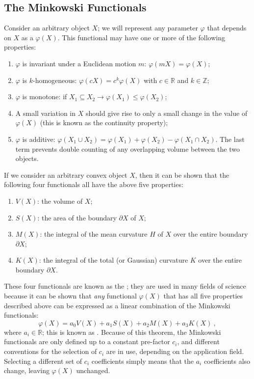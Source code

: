 \subsection{The Minkowski Functionals}\label{\chabbr:ssec:MinkFunc}
Consider an arbitrary object $X$; we will represent any parameter $\varphi$ that depends on $X$ as a  $\varphi(X)$.  This functional may have one or more of the following properties:
\begin{enumerate}
\item $\varphi$ is invariant under a Euclidean motion $m$: $\varphi(mX) = \varphi(X)$; 
\item $\varphi$ is $k$-homogeneous: $\varphi(cX)=c^k\varphi(X)$ with $c\in\mathbb{R}$ and $k\in\mathbb{Z}$;
\item $\varphi$ is monotone: if $X_1\subseteq X_2\rightarrow \varphi(X_1)\le \varphi(X_2)$;
\item A small variation in $X$ should give rise to only a small change in the value of $\varphi(X)$ (this is known as the continuity property);
\item $\varphi$ is additive: $\varphi(X_1\cup X_2) = \varphi(X_1)+\varphi(X_2)-\varphi(X_1\cap X_2)$. The last term prevents double counting of any overlapping volume between the two objects.
\end{enumerate}

\noindent If we consider an arbitrary convex object $X$, then it can be shown that the following four functionals all have the above five properties:
\begin{enumerate}
\item $V(X)$:  the volume of $X$;
\item $S(X)$: the area of the boundary $\partial X$ of $X$;
\item $M(X)$: the integral of the mean curvature $H$ of $X$ over the entire boundary $\partial X$;
\item $K(X)$: the integral of the total (or Gaussian) curvature $K$ over the entire boundary $\partial X$.
\end{enumerate}
These four functionals are known as the ; they are used in many fields of science because it can be shown that \textit{any} functional $\varphi(X)$ that has all five properties described above can be expressed as a linear combination of the Minkowski functionals:
\begin{equation}
	\varphi(X) = a_0V(X)+a_1S(X)+a_2M(X)+a_3K(X)\ ,\label{\chabbr:eq:Hadwiger}
\end{equation}
where $a_i\in\mathbb{R}$; this is known as .  Because of this theorem, the Minkowski functionals are only defined up to a constant pre-factor $c_i$, and different conventions for the selection of $c_i$ are in use, depending on the application field.  Selecting a different set of $c_i$ coefficients simply means that the $a_i$ coefficients also change, leaving $\varphi(X)$ unchanged.

